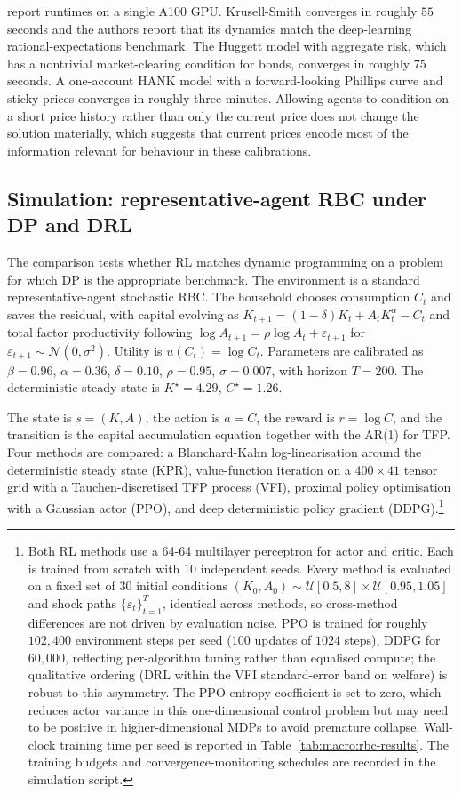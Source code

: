 \citet{Yang2025srl} report runtimes on a single A100 GPU. Krusell-Smith
converges in roughly $55$ seconds and the authors report that its
dynamics match the deep-learning rational-expectations benchmark.
The Huggett model with aggregate risk, which has a nontrivial
market-clearing condition for bonds, converges in roughly $75$
seconds. A one-account HANK model with a forward-looking Phillips
curve and sticky prices converges in roughly three
minutes. Allowing agents to condition on a short price history rather
than only the current price does not change the solution materially,
which suggests that current prices encode most of the information
relevant for behaviour in these calibrations.

\subsection{Simulation: representative-agent RBC under DP and DRL}
\label{sec:macro:simulation}

The comparison tests whether RL matches dynamic programming on a
problem for which DP is the appropriate benchmark. The environment is
a standard representative-agent stochastic RBC. The
household chooses consumption $C_t$ and saves the residual, with
capital evolving as $K_{t+1} = (1-\delta) K_t + A_t K_t^\alpha - C_t$
and total factor productivity following $\log A_{t+1} = \rho \log A_t
+ \varepsilon_{t+1}$ for $\varepsilon_{t+1} \sim \mathcal{N}(0,
\sigma^2)$. Utility is $u(C_t) = \log C_t$. Parameters are calibrated
as $\beta = 0.96$, $\alpha = 0.36$, $\delta = 0.10$, $\rho = 0.95$,
$\sigma = 0.007$, with horizon $T = 200$. The deterministic steady
state is $K^\star = 4.29$, $C^\star = 1.26$.

The state is $s = (K, A)$, the action
is $a = C$, the reward is $r = \log C$, and the transition is the
capital accumulation equation together with the AR(1) for TFP. Four
methods are compared: a Blanchard-Kahn log-linearisation around the
deterministic steady state (KPR), value-function iteration on a
$400 \times 41$ tensor grid with a Tauchen-discretised TFP process
(VFI), proximal policy optimisation with a Gaussian actor (PPO), and
deep deterministic policy gradient (DDPG).\footnote{Both RL methods
use a 64-64 multilayer perceptron for actor and critic. Each is
trained from scratch with $10$ independent seeds. Every method is
evaluated on a fixed set of $30$ initial conditions $(K_0, A_0) \sim
\mathcal{U}[0.5, 8] \times \mathcal{U}[0.95, 1.05]$ and shock paths
$\{\varepsilon_t\}_{t=1}^T$, identical across methods, so cross-method
differences are not driven by evaluation noise. PPO is trained for
roughly $102{,}400$ environment steps per seed ($100$ updates of
$1024$ steps), DDPG for $60{,}000$, reflecting per-algorithm tuning
rather than equalised compute; the qualitative ordering (DRL within
the VFI standard-error band on welfare) is robust to this asymmetry.
The PPO entropy coefficient is set to zero, which reduces actor
variance in this one-dimensional control problem but may need to be
positive in higher-dimensional MDPs to avoid premature collapse.
Wall-clock training time per seed is reported in
Table~\ref{tab:macro:rbc-results}. The training budgets and
convergence-monitoring schedules are recorded in the simulation
script.}

